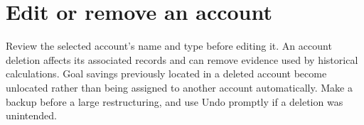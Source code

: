\section{Edit or remove an account}
Review the selected account's name and type before editing it. An account deletion affects its associated records and can remove evidence used by historical calculations. Goal savings previously located in a deleted account become unlocated rather than being assigned to another account automatically. Make a backup before a large restructuring, and use Undo promptly if a deletion was unintended.



